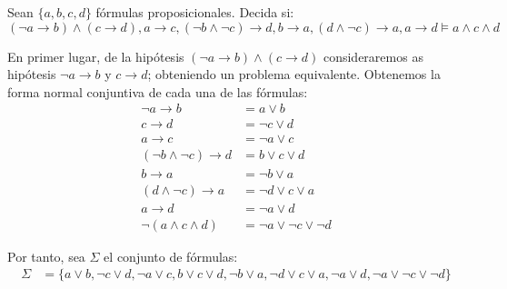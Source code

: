 \begin{ejercicio} \label{ej:1.3.7}
    Sean $\{a,b,c,d\}$ fórmulas proposicionales. Decida si:
    \begin{equation*}
        (\lnot a\rightarrow b)\land (c\rightarrow d),a\rightarrow c,(\lnot b\land \lnot c)\rightarrow d,b\rightarrow a,(d\land \lnot c)\rightarrow a,a\rightarrow d\vDash a\land c\land d
    \end{equation*}

    En primer lugar, de la hipótesis $(\lnot a\rightarrow b)\land (c\rightarrow d)$ consideraremos as hipótesis $\lnot a\rightarrow b$ y $c\rightarrow d$; obteniendo un problema equivalente.
    Obtenemos la forma normal conjuntiva de cada una de las fórmulas:
    \begin{align*}
        \lnot a\rightarrow b &= a\lor b\\
        c\rightarrow d &= \lnot c\lor d\\
        a\rightarrow c &= \lnot a\lor c\\
        (\lnot b\land \lnot c)\rightarrow d &= b\lor c\lor d\\
        b\rightarrow a &= \lnot b\lor a\\
        (d\land \lnot c)\rightarrow a &= \lnot d\lor c\lor a\\
        a\rightarrow d &= \lnot a\lor d\\
        \lnot (a\land c\land d) &= \lnot a\lor \lnot c\lor \lnot d
    \end{align*}

    Por tanto, sea $\Sigma$ el conjunto de fórmulas:
    \begin{align*}
        \Sigma &= \{a\lor b, \lnot c\lor d, \lnot a\lor c, b\lor c\lor d, \lnot b\lor a, \lnot d\lor c\lor a, \lnot a\lor d, \lnot a\lor \lnot c\lor \lnot d\}
    \end{align*}


\end{ejercicio}

